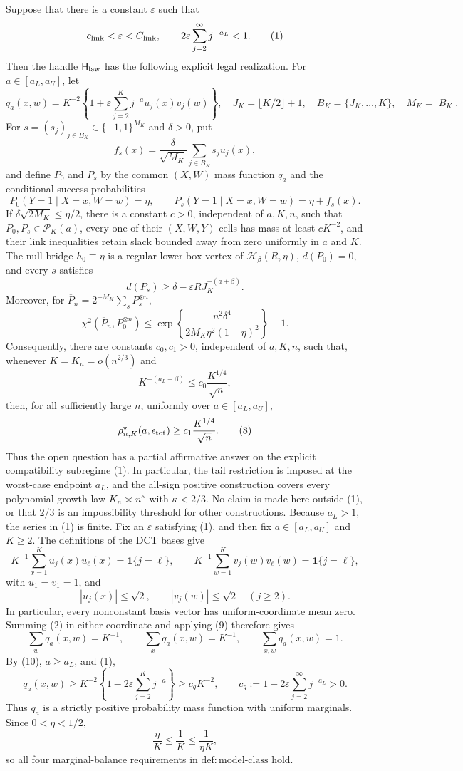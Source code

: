 Suppose that there is a constant \(\varepsilon\) such that
\[
c_{\rm link}<\varepsilon<C_{\rm link},
\qquad
2\varepsilon\sum_{j=2}^{\infty}j^{-a_L}<1.
\tag{1}
\]
Then the handle \(\mathsf H_{\rm law}\) has the following explicit legal realization.  For \(a\in[a_L,a_U]\), let
\[
q_a(x,w)=K^{-2}\left\{1+\varepsilon\sum_{j=2}^Kj^{-a}u_j(x)v_j(w)\right\},
\quad
J_K=\lfloor K/2\rfloor+1,
\quad
B_K=\{J_K,\ldots,K\},
\quad
M_K=|B_K|.
\tag{2}
\]
For \(s=(s_j)_{j\in B_K}\in\{-1,1\}^{M_K}\) and \(\delta>0\), put
\[
f_s(x)=\frac{\delta}{\sqrt{M_K}}\sum_{j\in B_K}s_ju_j(x),
\tag{3}
\]
and define \(P_0\) and \(P_s\) by the common \((X,W)\) mass function \(q_a\) and the conditional success probabilities
\[
P_0(Y=1\mid X=x,W=w)=\eta,
\qquad
P_s(Y=1\mid X=x,W=w)=\eta+f_s(x).
\tag{4}
\]
If \(\delta\sqrt{2M_K}\le \eta/2\), there is a constant \(c>0\), independent of \(a,K,n\), such that \(P_0,P_s\in\mathcal P_K(a)\), every one of their \((X,W,Y)\) cells has mass at least \(cK^{-2}\), and their link inequalities retain slack bounded away from zero uniformly in \(a\) and \(K\).  The null bridge \(h_0\equiv\eta\) is a regular lower-box vertex of \(\mathcal H_\beta(R,\eta)\), \(d(P_0)=0\), and every \(s\) satisfies
\[
d(P_s)\ge \delta-\varepsilon R J_K^{-(a+\beta)}.
\tag{5}
\]
Moreover, for \(\overline P_n=2^{-M_K}\sum_sP_s^{\otimes n}\),
\[
\chi^2\!\left(\overline P_n,P_0^{\otimes n}\right)
\le
\exp\!\left\{\frac{n^2\delta^4}{2M_K\eta^2(1-\eta)^2}\right\}-1.
\tag{6}
\]
Consequently, there are constants \(c_0,c_1>0\), independent of \(a,K,n\), such that, whenever \(K=K_n=o(n^{2/3})\) and
\[
K^{-(a_L+\beta)}\le c_0\frac{K^{1/4}}{\sqrt n},
\tag{7}
\]
then, for all sufficiently large \(n\), uniformly over \(a\in[a_L,a_U]\),
\[
\rho^\star_{n,K}(a,\epsilon_{\rm tot})
\ge c_1\frac{K^{1/4}}{\sqrt n}.
\tag{8}
\]
Thus the open question has a partial affirmative answer on the explicit compatibility subregime (1).  In particular, the tail restriction is imposed at the worst-case endpoint \(a_L\), and the all-sign positive construction covers every polynomial growth law \(K_n\asymp n^\kappa\) with \(\kappa<2/3\).  No claim is made here outside (1), or that \(2/3\) is an impossibility threshold for other constructions.
Because \(a_L>1\), the series in (1) is finite.  Fix an \(\varepsilon\) satisfying (1), and then fix \(a\in[a_L,a_U]\) and \(K\ge2\).  The definitions of the DCT bases give
\[
K^{-1}\sum_{x=1}^Ku_j(x)u_\ell(x)=\mathbf 1\{j=\ell\},
\qquad
K^{-1}\sum_{w=1}^Kv_j(w)v_\ell(w)=\mathbf 1\{j=\ell\},
\tag{9}
\]
with \(u_1=v_1=1\), and
\[
|u_j(x)|\le\sqrt2,
\qquad
|v_j(w)|\le\sqrt2
\quad (j\ge2).
\tag{10}
\]
In particular, every nonconstant basis vector has uniform-coordinate mean zero.  Summing (2) in either coordinate and applying (9) therefore gives
\[
\sum_wq_a(x,w)=K^{-1},
\qquad
\sum_xq_a(x,w)=K^{-1},
\qquad
\sum_{x,w}q_a(x,w)=1.
\tag{11}
\]
By (10), \(a\ge a_L\), and (1),
\[
q_a(x,w)
\ge K^{-2}\left\{1-2\varepsilon\sum_{j=2}^Kj^{-a}\right\}
\ge c_qK^{-2},
\qquad
c_q:=1-2\varepsilon\sum_{j=2}^{\infty}j^{-a_L}>0.
\tag{12}
\]
Thus \(q_a\) is a strictly positive probability mass function with uniform marginals.  Since \(0<\eta<1/2\),
\[
\frac{\eta}{K}\le\frac1K\le\frac1{\eta K},
\tag{13}
\]
so all four marginal-balance requirements in \(\mathrm{def:model\mbox{-}class}\) hold.

